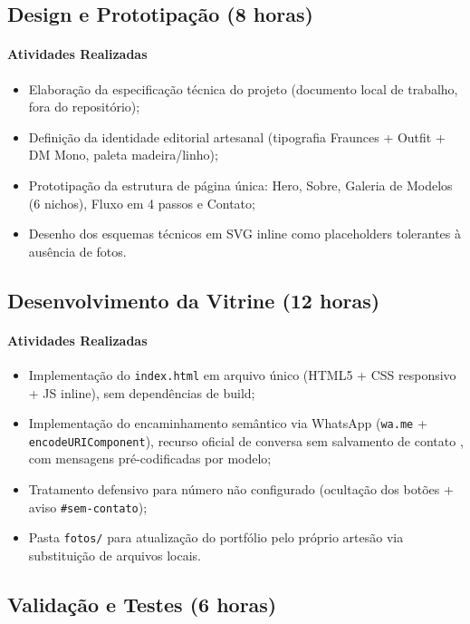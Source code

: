 \documentclass[12pt,a4paper]{article}
\begin{document}
\subsection{Design e Prototipação (8 horas)}

\paragraph{Atividades Realizadas}
\begin{itemize}[leftmargin=*]
\item Elaboração da especificação técnica do projeto (documento local de trabalho, fora do repositório);
\item Definição da identidade editorial artesanal (tipografia Fraunces + Outfit + DM Mono, paleta madeira/linho);
\item Prototipação da estrutura de página única: Hero, Sobre, Galeria de Modelos (6 nichos), Fluxo em 4 passos e Contato;
\item Desenho dos esquemas técnicos em SVG inline como placeholders tolerantes à ausência de fotos.
\end{itemize}

\subsection{Desenvolvimento da Vitrine (12 horas)}

\paragraph{Atividades Realizadas}
\begin{itemize}[leftmargin=*]
\item Implementação do \texttt{index.html} em arquivo único (HTML5 + CSS responsivo + JS inline), sem dependências de build;
\item Implementação do encaminhamento semântico via WhatsApp (\texttt{wa.me} + \texttt{encodeURIComponent}), recurso oficial de conversa sem salvamento de contato \cite{whatsapp}, com mensagens pré-codificadas por modelo;
\item Tratamento defensivo para número não configurado (ocultação dos botões + aviso \texttt{\#sem-contato});
\item Pasta \texttt{fotos/} para atualização do portfólio pelo próprio artesão via substituição de arquivos locais.
\end{itemize}

\subsection{Validação e Testes (6 horas)}
\end{document}
